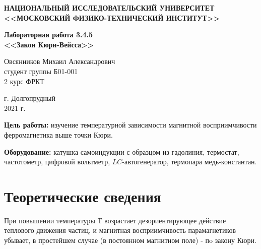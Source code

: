 \documentclass[a4paper,12pt]{article} %
\begin{document}
	\begin{center}
		
		\textbf{НАЦИОНАЛЬНЫЙ ИССЛЕДОВАТЕЛЬСКИЙ УНИВЕРСИТЕТ \\ <<МОСКОВСКИЙ ФИЗИКО-ТЕХНИЧЕСКИЙ ИНСТИТУТ>>}
		\vspace{13ex}
		
		\textbf{Лабораторная работа 3.4.5 \\ <<Закон Кюри-Вейсса>> }
		\vspace{60ex}
		
		\normalsize{Овсянников Михаил Александрович \\ студент группы Б01-001\\ 2 курс ФРКТ\\}
	\end{center}
	
	\vfill 
	
	\begin{center}
		г. Долгопрудный\\ 
		2021 г.
	\end{center}
	
	\thispagestyle{empty} %
	
	\newpage
	
	
	
\textbf{Цель работы:} изучение температурной зависимости магнитной восприимчивости ферромагнетика выше точки Кюри.

\vspace{5mm}	
\textbf{Оборудование:} катушка самоиндукции с образцом из гадолиния, термостат, частотометр, цифровой вольтметр, $ LC$-автогенератор, термопара медь-константан.


\section*{Теоретические сведения}

При повышении температуры $Т$ возрастает дезориентирующее действие теплового движения частиц, и магнитная восприимчивость парамагнетиков убывает, в простейшем случае (в постоянном магнитном поле) - пo закону Кюри.
\end{document}
